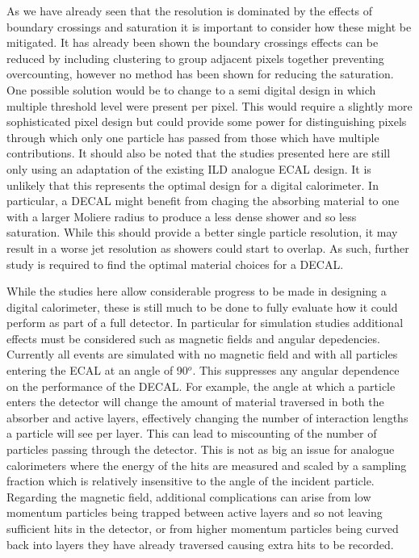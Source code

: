 As we have already seen that the resolution is dominated by the effects of boundary crossings and saturation it is important to consider how these might be mitigated. It has already been shown the boundary crossings effects can be reduced by including clustering to group adjacent pixels together preventing overcounting, however no method has been shown for reducing the saturation. One possible solution would be to change to a semi digital design in which multiple threshold level were present per pixel. This would require a slightly more sophisticated pixel design but could provide some power for distinguishing pixels through which only one particle has passed from those which have multiple contributions. It should also be noted that the studies presented here are still only using an adaptation of the existing \ac{ILD} analogue \ac{ECAL} design. It is unlikely that this represents the optimal design for a digital calorimeter. In particular, a \ac{DECAL} might benefit from chaging the absorbing material to one with a larger Moliere radius to produce a less dense shower and so less saturation. While this should provide a better single particle resolution, it may result in a worse jet resolution as showers could start to overlap. As such, further study is required to find the optimal material choices for a \ac{DECAL}.


While the studies here allow considerable progress to be made in designing a digital calorimeter, these is still much to be done to fully evaluate how it could perform as part of a full detector. In particular for simulation studies additional effects must be considered such as magnetic fields and angular depedencies. Currently all events are simulated with no magnetic field and with all particles entering the \ac{ECAL} at an angle of 90$^o$. This suppresses any angular dependence on the performance of the \ac{DECAL}. For example, the angle at which a particle enters the detector will change the amount of material traversed in both the absorber and active layers, effectively changing the number of interaction lengths a particle will see per layer. This can lead to miscounting of the number of particles passing through the detector. This is not as big an issue for analogue calorimeters where the energy of the hits are measured and scaled by a sampling fraction which is relatively insensitive to the angle of the incident particle. Regarding the magnetic field, additional complications can arise from low momentum particles being trapped between active layers and so not leaving sufficient hits in the detector, or from higher momentum particles being curved back into layers they have already traversed causing extra hits to be recorded.

